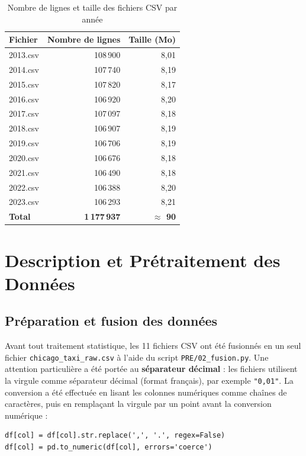 \documentclass[11pt,a4paper]{article}
\newcommand{\thead}[1]{\textbf{#1}}
\newcommand{\headrowcolor}{\rowcolor{headrow}}
\begin{document}
\begin{table}[H]
\centering
\caption{Nombre de lignes et taille des fichiers CSV par année}
\label{tab:fichiers}
\begin{tabular}{lrr}
\toprule
\headrowcolor \thead{Fichier} & \thead{Nombre de lignes} & \thead{Taille (Mo)} \\
\midrule
2013.csv & 108\,900 & 8{,}01 \\
2014.csv & 107\,740 & 8{,}19 \\
2015.csv & 107\,820 & 8{,}17 \\
2016.csv & 106\,920 & 8{,}20 \\
2017.csv & 107\,097 & 8{,}18 \\
2018.csv & 106\,907 & 8{,}19 \\
2019.csv & 106\,706 & 8{,}19 \\
2020.csv & 106\,676 & 8{,}18 \\
2021.csv & 106\,490 & 8{,}18 \\
2022.csv & 106\,388 & 8{,}20 \\
2023.csv & 106\,293 & 8{,}21 \\
\midrule
\textbf{Total} & \textbf{1\,177\,937} & \textbf{$\approx$ 90} \\
\bottomrule
\end{tabular}
\end{table}

\section{Description et Prétraitement des Données}

\subsection{Préparation et fusion des données}

Avant tout traitement statistique, les 11 fichiers CSV ont été fusionnés en un seul fichier
\texttt{chicago\_taxi\_raw.csv} à l'aide du script \texttt{PRE/02\_fusion.py}. Une attention particulière a été
portée au \textbf{séparateur décimal} : les fichiers utilisent la virgule comme séparateur décimal (format
français), par exemple \texttt{"0,01"}. La conversion a été effectuée en lisant les colonnes numériques comme
chaînes de caractères, puis en remplaçant la virgule par un point avant la conversion numérique :

\begin{verbatim}
df[col] = df[col].str.replace(',', '.', regex=False)
df[col] = pd.to_numeric(df[col], errors='coerce')
\end{verbatim}
\end{document}
